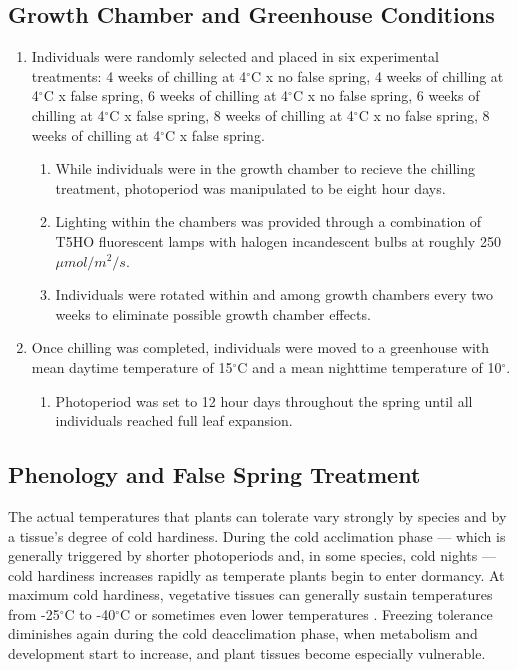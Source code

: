 \documentclass{article}\usepackage[]{graphicx}\usepackage[]{color}
\begin{document}
\subsection*{Growth Chamber and Greenhouse Conditions}
\begin{enumerate}
\item Individuals were randomly selected and placed in six experimental treatments: 4 weeks of chilling at 4$^{\circ}$C x no false spring, 4 weeks of chilling at 4$^{\circ}$C x false spring, 6 weeks of chilling at 4$^{\circ}$C x no false spring, 6 weeks of chilling at 4$^{\circ}$C x false spring,
8 weeks of chilling at 4$^{\circ}$C x no false spring, 8 weeks of chilling at 4$^{\circ}$C x false spring.
  \begin{enumerate}
  \item While individuals were in the growth chamber to recieve the chilling treatment, photoperiod was manipulated to be eight hour days.
  \item Lighting within the chambers was provided through a combination of T5HO fluorescent lamps with halogen incandescent bulbs at roughly 250 $\mu mol/m^{2}/s$.
  \item Individuals were rotated within and among growth chambers every two weeks to eliminate possible growth chamber effects.
  \end{enumerate}
\item Once chilling was completed, individuals were moved to a greenhouse with mean daytime temperature of 15$^{\circ}$C and a mean nighttime temperature of 10$^{\circ}$.
  \begin{enumerate}
  \item Photoperiod was set to 12 hour days throughout the spring until all individuals reached full leaf expansion.
  \end{enumerate}
\end{enumerate}
\subsection*{Phenology and False Spring Treatment}



  
  The actual temperatures that plants can tolerate vary strongly by species  and by a tissue's degree of cold hardiness. During the cold acclimation phase --- which is generally triggered by shorter photoperiods \citep{Howe2003, Charrier2011, Strimbeck2015, Welling1997} and, in some species, cold nights \citep{Charrier2011, Heide2005} --- cold hardiness increases rapidly as temperate plants begin to enter dormancy. At maximum cold hardiness, vegetative tissues can generally sustain temperatures from -25$^{\circ}$C to -40$^{\circ}$C \citep{Charrier2011,Korner2012,Vitasse2014} or sometimes even lower temperatures \citep[to -60$^{\circ}$C in extreme cases,][] {Korner2012}. Freezing tolerance diminishes again during the cold deacclimation phase, when metabolism and development start to increase, and plant tissues become especially vulnerable. 
\end{document}
